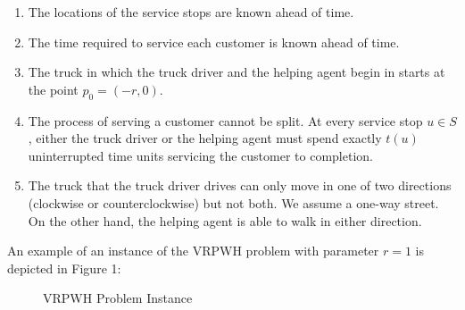 \documentclass[12pt]{scrartcl}
\begin{document}
\begin{enumerate}
    \item The locations of the service stops are known ahead of time. 
    \item The time required to service each customer is known ahead of time.
    \item The truck in which the truck driver and the helping agent begin in starts at the point $p_0 = (-r, 0)$. 
    \item The process of serving a customer cannot be split. At every service stop $u \in S$, either the truck driver or the helping agent must spend exactly $t(u)$ uninterrupted time units servicing the customer to completion. 
    \item The truck that the truck driver drives can only move in one of two directions (clockwise or counterclockwise) but not both. We assume a one-way street. On the other hand, the helping agent is able to walk in either direction.  
\end{enumerate}

An example of an instance of the VRPWH problem with parameter $r = 1$ is depicted in Figure 1: 

\begin{figure}[H]
\centering
{}
\caption{VRPWH Problem Instance}
\end{figure}
\end{document}
